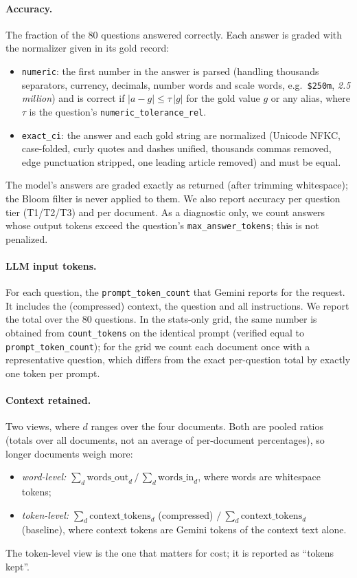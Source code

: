 \documentclass[11pt]{article}
\newcommand{\code}[1]{\texttt{#1}}
\begin{document}
\paragraph{Accuracy.} The fraction of the 80 questions answered correctly. Each answer is graded with
the normalizer given in its gold record:
\begin{itemize}
  \item \code{numeric}: the first number in the answer is parsed (handling thousands separators,
        currency, decimals, number words and scale words, e.g.\ \code{\$250m}, \emph{2.5 million}) and is
        correct if $|a - g| \le \tau\,|g|$ for the gold value $g$ or any alias, where $\tau$ is the
        question's \code{numeric\_tolerance\_rel}.
  \item \code{exact\_ci}: the answer and each gold string are normalized (Unicode NFKC, case-folded,
        curly quotes and dashes unified, thousands commas removed, edge punctuation stripped, one
        leading article removed) and must be equal.
\end{itemize}
The model's answers are graded exactly as returned (after trimming whitespace); the Bloom filter is
never applied to them. We also report accuracy per question tier (T1/T2/T3) and per document. As a
diagnostic only, we count answers whose output tokens exceed the question's
\code{max\_answer\_tokens}; this is not penalized.

\paragraph{LLM input tokens.} For each question, the \code{prompt\_token\_count} that Gemini reports
for the request. It includes the (compressed) context, the question and all instructions. We report
the total over the 80 questions. In the stats-only grid, the same number is obtained from
\code{count\_tokens} on the identical prompt (verified equal to \code{prompt\_token\_count}); for the
grid we count each document once with a representative question, which differs from the exact
per-question total by exactly one token per prompt.

\paragraph{Context retained.} Two views, where $d$ ranges over the four documents. Both are pooled
ratios (totals over all documents, not an average of per-document percentages), so longer documents
weigh more:
\begin{itemize}
  \item \emph{word-level:} $\sum_d \text{words\_out}_d \,/\, \sum_d \text{words\_in}_d$, where words are
        whitespace tokens;
  \item \emph{token-level:} $\sum_d \text{context\_tokens}_d$ (compressed) $/\ \sum_d
        \text{context\_tokens}_d$ (baseline), where context tokens are Gemini tokens of the context
        text alone.
\end{itemize}
The token-level view is the one that matters for cost; it is reported as ``tokens kept''.
\end{document}
